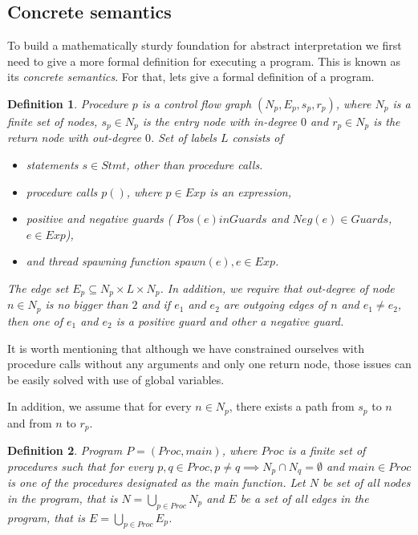 \documentclass[..thesis.tex]{subfiles}
\newtheorem{defin}{Definition}[section]
\begin{document}
\subsection{Concrete semantics}

To build a mathematically sturdy foundation for abstract interpretation we first need to give a more formal definition for executing a program.
This is known as its \emph{concrete semantics}.
 For that, lets give a formal definition of a program.

\begin{defin}
Procedure $p$ is a \textit{control flow graph} $\left( N_p,E_p,s_p,r_p \right)$, where $N_p$ is a finite set of nodes, $s_p \in N_p$
 is the \textit{entry} node with in-degree $0$ and  $r_p \in N_p$ is the \textit{return} node with out-degree $0$. Set of labels $L$ consists of
\begin{itemize}
\item statements $s \in Stmt$, other than procedure calls.
\item procedure calls $p()$, where $p \in Exp$ is an expression, 
\item positive and negative guards ( $Pos\left( e \right) in Guards$ and  $Neg \left( e \right) \in Guards$, $e \in Exp$),
\item and thread spawning function $spawn\left( e \right), e \in Exp$.  
\end{itemize}
The edge set  $E_p \subseteq N_p \times L \times N_p$. In addition, we require that out-degree of node $n \in N_p$ is no bigger than $2$ 
and if $e_1$ and $e_2$ are outgoing edges of $n$ and $e_1 \neq e_2$, then one of $e_1$ and $e_2$ is a positive guard and other a negative guard. 
\end{defin}

It is worth mentioning that although we have constrained ourselves with procedure calls without any arguments and only one return node,
 those issues can be easily solved with use of global variables. 

In addition, we assume that for every $n \in N_p$, there exists a path from $s_p$ to $n$ and from $n$ to $r_p$.  

\begin{defin}
Program $P = \left( Proc, main \right)$, where $Proc$ is a finite set of procedures such that for every $p,q \in Proc, p \neq q \implies N_p \cap N_q = \emptyset$ 
and $main \in Proc$ is one of the procedures designated as the main function.
 Let $N$ be set of all nodes in the program, that is $N = \bigcup_{p \in Proc}N_p$ and $E$ be a set of all edges in the program, that is $E = \bigcup_{p \in Proc}E_p$. 
\end{defin}
\end{document}
